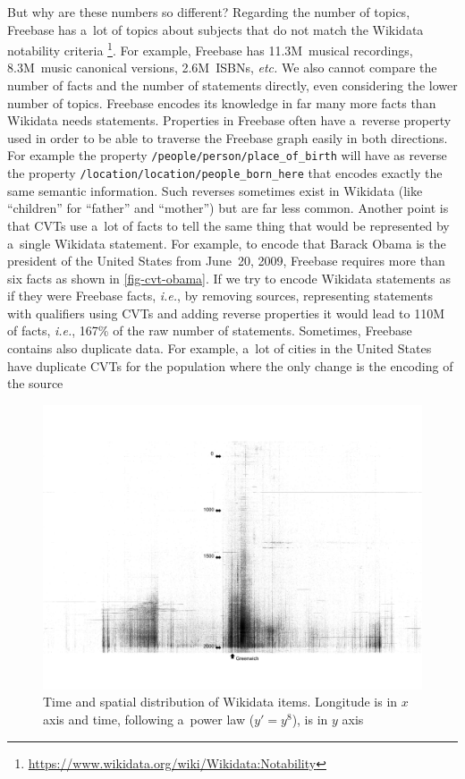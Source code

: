 \documentclass{sig-alternate}
\begin{document}
But why are these numbers so different?
Regarding the number of topics, Freebase has a~lot of topics about subjects
that do not match the Wikidata notability criteria%
\footnote{\url{https://www.wikidata.org/wiki/Wikidata:Notability}}.
For example, Freebase has 11.3M~musical recordings, 8.3M~music canonical versions,
2.6M~ISBNs, \emph{etc.}
We also cannot compare the number of facts and the number of statements directly,
even considering the lower number of topics.
Freebase encodes its knowledge in far many more facts than Wikidata needs statements.
Properties in Freebase often have a~reverse property used in order to be able
to traverse the Freebase graph easily in both directions.
For example the property \texttt{/people/person/place\_of\_birth} will have as reverse
the property \texttt{/location/location/people\_born\_here} that encodes
exactly the same semantic information.
Such reverses sometimes exist in Wikidata (like ``children'' for ``father'' and ``mother'')
but are far less common.
Another point is that CVTs use a~lot of facts to tell the same thing that
would be represented by a~single Wikidata statement.
For example, to encode that Barack Obama is the president of the United States from June~20, 2009,
Freebase requires more than six facts as shown in \autoref{fig-cvt-obama}.
If we try to encode Wikidata statements as if they were Freebase facts, \emph{i.e.},
by removing sources, representing statements with qualifiers using CVTs
and adding reverse properties it would lead to 110M of facts,
\emph{i.e.}, 167\% of the raw number of statements.
Sometimes, Freebase contains also duplicate data.
For example, a~lot of cities in the United States have duplicate CVTs for the population
where the only change is the encoding of the source

\begin{figure}
\centering
\includegraphics[width=8.45 cm]{img/wikidata-time-space.png}
\caption{Time and spatial distribution of Wikidata items.
Longitude is in $x$ axis and time, following a~power law ($y' = y^8$), is in $y$ axis}
\label{fig-time-space-wikidata}
\end{figure}
\end{document}
